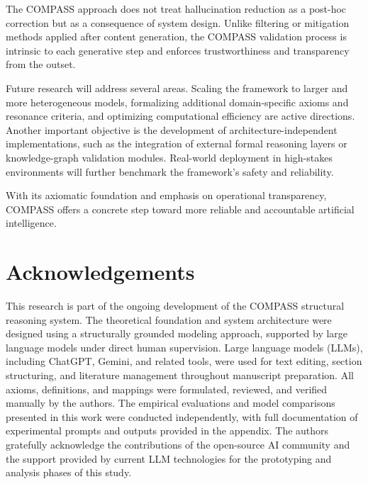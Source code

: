 \documentclass[11pt,a4paper]{article}
\begin{document}
The COMPASS approach does not treat hallucination reduction as a post-hoc correction but as a consequence of system design. Unlike filtering or mitigation methods applied after content generation, the COMPASS validation process is intrinsic to each generative step and enforces trustworthiness and transparency from the outset.

Future research will address several areas. Scaling the framework to larger and more heterogeneous models, formalizing additional domain-specific axioms and resonance criteria, and optimizing computational efficiency are active directions. Another important objective is the development of architecture-independent implementations, such as the integration of external formal reasoning layers or knowledge-graph validation modules. Real-world deployment in high-stakes environments will further benchmark the framework’s safety and reliability.

With its axiomatic foundation and emphasis on operational transparency, COMPASS offers a concrete step toward more reliable and accountable artificial intelligence.

\appendix




% 

\section*{Acknowledgements}

This research is part of the ongoing development of the COMPASS structural reasoning system. The theoretical foundation and system architecture were designed using a structurally grounded modeling approach, supported by large language models under direct human supervision. Large language models (LLMs), including ChatGPT, Gemini, and related tools, were used for text editing, section structuring, and literature management throughout manuscript preparation. All axioms, definitions, and mappings were formulated, reviewed, and verified manually by the authors. The empirical evaluations and model comparisons presented in this work were conducted independently, with full documentation of experimental prompts and outputs provided in the appendix. The authors gratefully acknowledge the contributions of the open-source AI community and the support provided by current LLM technologies for the prototyping and analysis phases of this study.




\end{document}
